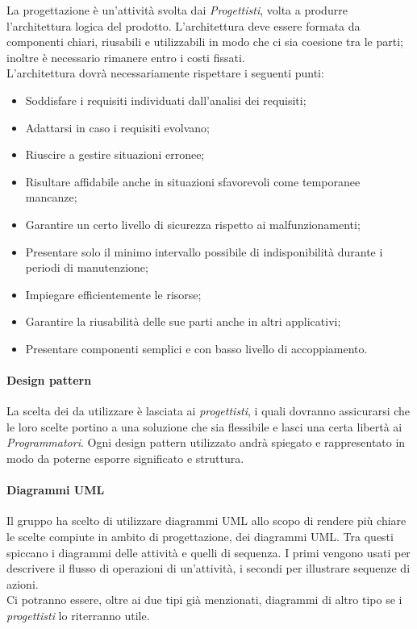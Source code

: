 La progettazione è un'attività svolta dai \emph{Progettisti}, volta a produrre l'architettura logica del prodotto. 
L'architettura deve essere formata da componenti chiari, riusabili e utilizzabili in modo che ci sia coesione tra 
le parti; inoltre è necessario rimanere entro i costi fissati.\\
L'architettura dovrà necessariamente rispettare i seguenti punti: 
\begin{itemize}
    \item Soddisfare i requisiti individuati dall'analisi dei requisiti;
    \item Adattarsi in caso i requisiti evolvano;
    \item Riuscire a gestire situazioni erronee;
    \item Risultare affidabile anche in situazioni sfavorevoli come temporanee mancanze;
    \item Garantire un certo livello di sicurezza rispetto ai malfunzionamenti;
    \item Presentare solo il minimo intervallo possibile di indisponibilità durante i periodi di manutenzione;
    \item Impiegare efficientemente le risorse;
    \item Garantire la riusabilità delle sue parti anche in altri applicativi;
    \item Presentare componenti semplici e con basso livello di accoppiamento.
\end{itemize}
 
\paragraph{Design pattern}

La scelta dei  da utilizzare è lasciata ai \emph{progettisti}, i quali dovranno 
assicurarsi che le loro scelte portino a una soluzione che sia flessibile e lasci una certa libertà ai 
\emph{Programmatori}. Ogni design pattern utilizzato andrà spiegato e rappresentato in modo da poterne esporre 
significato e struttura.

\paragraph{Diagrammi UML}

Il gruppo ha scelto di utilizzare diagrammi UML allo scopo di rendere più chiare le scelte compiute in ambito di 
progettazione, dei diagrammi UML. Tra questi spiccano i diagrammi delle attività e quelli di sequenza. I primi vengono 
usati per descrivere il flusso di operazioni di un'attività, i secondi per illustrare sequenze di azioni.\\
Ci potranno essere, oltre ai due tipi già menzionati, diagrammi di altro tipo se i \emph{progettisti} lo riterranno 
utile.

